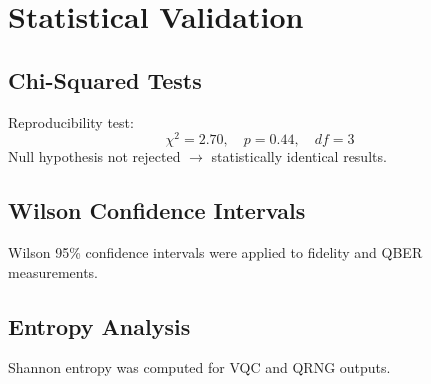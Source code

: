 \section{Statistical Validation}

\subsection{Chi-Squared Tests}
Reproducibility test:
\[
\chi^2 = 2.70,\quad p = 0.44,\quad df = 3
\]
Null hypothesis not rejected $\rightarrow$ statistically identical results.

\subsection{Wilson Confidence Intervals}
Wilson 95\% confidence intervals were applied to fidelity and QBER measurements.

\subsection{Entropy Analysis}
Shannon entropy was computed for VQC and QRNG outputs.
